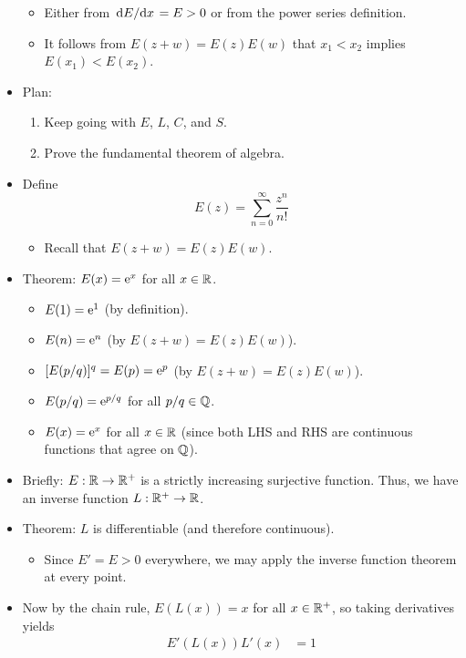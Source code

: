 \documentclass[../notes.tex]{subfiles}
\begin{document}
\begin{itemize}
\begin{itemize}
        \item Either from $\dv*{E}{x}=E>0$ or from the power series definition.
        \item It follows from $E(z+w)=E(z)E(w)$ that $x_1<x_2$ implies $E(x_1)<E(x_2)$.
    \end{itemize}
    \item {}Plan:
    \begin{enumerate}
        \item Keep going with $E$, $L$, $C$, and $S$.
        \item Prove the fundamental theorem of algebra.
    \end{enumerate}
    \item Define
    \begin{equation*}
        E(z) = \sum_{n=0}^\infty\frac{z^n}{n!}
    \end{equation*}
    \begin{itemize}
        \item Recall that $E(z+w)=E(z)E(w)$.
    \end{itemize}
    \item Theorem: $E(x)=\e[x]$ for all $x\in\R$.
    \begin{itemize}
        \item $E(1)=\e[1]$ (by definition).
        \item $E(n)=\e[n]$ (by $E(z+w)=E(z)E(w)$).
        \item $[E(p/q)]^q=E(p)=\e[p]$ (by $E(z+w)=E(z)E(w)$).
        \item $E(p/q)=\e[p/q]$ for all $p/q\in\Q$.
        \item $E(x)=\e[x]$ for all $x\in\R$ (since both LHS and RHS are continuous functions that agree on $\Q$).
    \end{itemize}
    \item Briefly: $E:\R\to\R^+$ is a strictly increasing surjective function. Thus, we have an inverse function $L:\R^+\to\R$.
    \item Theorem: $L$ is differentiable (and therefore continuous).
    \begin{itemize}
        \item Since $E'=E>0$ everywhere, we may apply the inverse function theorem at every point.
    \end{itemize}
    \item Now by the chain rule, $E(L(x))=x$ for all $x\in\R^+$, so taking derivatives yields
    \begin{align*}
        E'(L(x))L'(x) &= 1\\

\end{align*}
\end{itemize}
\end{document}
